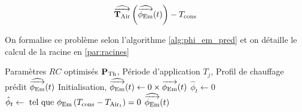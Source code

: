         \begin{equation}
            \operatorname{\widehat{\overrightarrow{\mathbf{T}_{\text{Air}}}}}\left(\operatorname{\widehat{\overrightarrow{\phi_{\text{Em}}}}}(t)\right)  - T_{\text{cons}}\label{eq:fminphiemdistrisim}
        \end{equation}

        On formalise ce problème selon l'algorithme \ref{alg:phi_em_pred} et on détaille le calcul de la racine en \ref{par:racines}

        \begin{algorithm}[H]
            \caption{Prédiction du besoin de chauffage par calcul itératif sous contraintes de la température intérieure}\label{alg:phi_em_pred}
            \begin{algorithmic}[1]
                \Require 
                Paramètres $RC$ optimisés $\mathbf P_{\text{Th}}$, 
                Période d'application $T_j$,
                \Ensure 
                Profil de chauffage prédit $\operatorname{\widehat{\overrightarrow{\phi_{\text{Em}}}}}(t)$
                \State Initialisation, $\operatorname{\widehat{\overrightarrow{\phi_{\text{Em}}}}}(t) \gets 0\times \operatorname{\overrightarrow{\mathbf{\phi}_{\text{Em}}}}(t)$
                        \State $\hat\phi_t \gets 0$
                    \Else
                        \State $\hat\phi_t \gets \text{ tel que } \phi_{\text{Em}}\left( T_{\text{cons}} - T_{{\text{Air}_t}} \right) = 0$
                    \EndIf
                \EndFor
                \Return $\operatorname{\widehat{\overrightarrow{\phi_{\text{Em}}}}}(t)$
            \end{algorithmic}
        \end{algorithm}

